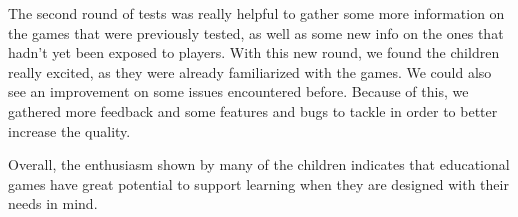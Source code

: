 The second round of tests was really helpful to gather some more information on the games that were previously tested, as well as some new info on the ones that hadn't yet been exposed to players. With this new round, we found the children really excited, as they were already familiarized with the games. We could also see an improvement on some issues encountered before. Because of this, we gathered more feedback and some features and bugs to tackle in order to better increase the quality.

Overall, the enthusiasm shown by many of the children indicates that educational games have great potential to support learning when they are designed with their needs in mind.





